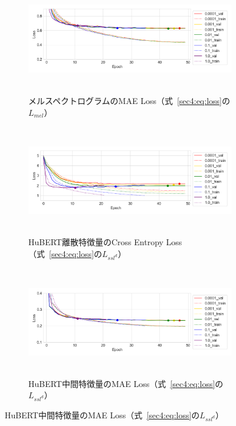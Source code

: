 \documentclass[12pt]{jarticle}
\numberwithin{equation}{section}    %
\numberwithin{figure}{section}      %
\numberwithin{table}{section}      %
\begin{document}
\begin{figure}[bt]
    \centering
    \begin{subfigure}{\linewidth}
        \centering
        \includegraphics[height=48mm]{./figure/sec4/learning_curves/1/mel_loss.png}
        \caption{メルスペクトログラムのMAE Loss（式~\eqref{sec4:eq:loss}の$L_{mel}$）}
        \label{sec4:fig:learning_curve_method_1_proposed_val_mel_loss}
    \end{subfigure}
    \begin{subfigure}{\linewidth}
        \centering
        \includegraphics[height=48mm]{./figure/sec4/learning_curves/1/ssl_feature_cluster_loss.png}
        \caption{HuBERT離散特徴量のCross Entropy Loss（式~\eqref{sec4:eq:loss}の$L_{ssl^{d}}$）}
        \label{sec4:fig:learning_curve_method_1_proposed_val_ssl_feature_cluster_loss}
    \end{subfigure}
    \begin{subfigure}{\linewidth}
        \centering
        \includegraphics[height=48mm]{./figure/sec4/learning_curves/1/ssl_conv_feature_loss.png}
        \caption{HuBERT中間特徴量のMAE Loss（式~\eqref{sec4:eq:loss}の$L_{ssl^{d}}$）}

\end{subfigure}
\end{figure}
\end{document}

